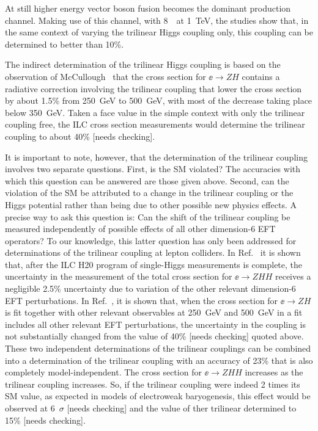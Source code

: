 At still higher energy vector boson fusion becomes the dominant
production channel. Making use of this channel, with  8~\iab\ at
1~TeV, the studies \cite{TianHHH,Roloff:2019crr} show that, in the
same context of varying the trilinear Higgs coupling only, this
coupling can be determined to better than 10\%. 



The indirect determination of the trilinear Higgs coupling is based on
the observation of McCullough~\cite{McCullough:2013rea} that the cross
section for $\ee\to ZH$ contains a radiative correction involving the
trilinear coupling that lower the cross section by about 1.5\% from
250~GeV to 500~GeV, with most of the decrease taking place below
350~GeV.  Taken a face value in the simple context with only the
trilinear coupling free, the ILC cross section measurements would determine the trilinear 
coupling to about 40\% [needs checking].

It is important to note, however, that the determination of the
trilinear coupling involves two separate questions.  First, is the SM
violated?   The accuracies with which this question can be answered
are those given above.  Second, can the violation of the SM be
attributed to a change in the trilinear coupling or the Higgs
potential rather than being due to other possible new physics
effects.  A precise way to ask this question is: Can the shift of the
trilinear coupling be measured  independently of possible effects of
all 
other dimension-6 EFT operators?   To our knowledge, this latter
question has only been addressed for determinations of the trilinear
coupling at lepton colliders.   In Ref.~\cite{Barklow:2017awn} it is
shown that, after the ILC H20 program of single-Higgs measurements is
complete, the uncertainty in the measurement of the total cross
section for  $\ee\to ZHH$ receives a negligible 2.5\% uncertainty due
to variation of the other relevant dimension-6 EFT perturbations.   In
Ref.~\cite{DiVita:2017vrr}, it is shown that, when the cross section
for $\ee\to ZH$ is fit together with other relevant observables at
250~GeV and 500~GeV
in a fit includes all other relevant EFT perturbations, the
uncertainty in the coupling is not substantially changed from the value of
40\%  [needs checking] quoted above.   These two
independent determinations of the trilinear couplings can be combined
into a determination of the trilinear coupling  with an accuracy of 23\% that is
also completely model-independent.  The cross section for $\ee\to ZHH$
increases as the  trilinear coupling increases.   So, if the trilinear coupling were
indeed 2 times its SM value, as expected in models of electroweak
baryogenesis, this effect would be observed at 6~$\sigma$ [needs
checking] and the value of ther trilinear determined to 15\% [needs
checking]. 




